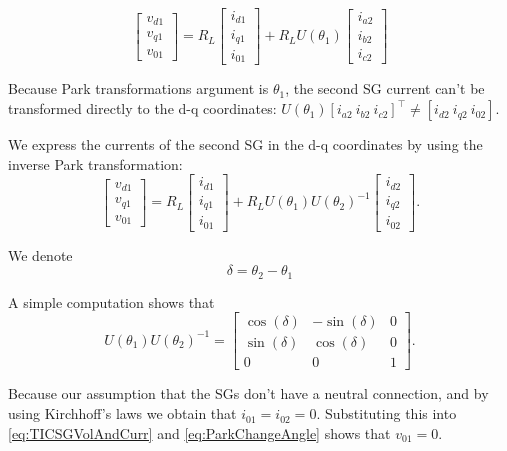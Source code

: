 \documentclass[conference]{IEEEtran}
\newcommand{\BE}{\begin{equation}}
\newcommand{\BEQ}[1]{\BE\label{#1}} %
\begin{document}
$$
\left[\begin{array}{c}
v_{d1}\\
v_{q1}\\
v_{01}
\end{array}\right]=R_{L}\left[\begin{array}{c}
i_{d1}\\
i_{q1}\\
i_{01}
\end{array}\right]+R_{L}U(\theta_{1})\left[\begin{array}{c}
i_{a2}\\
i_{b2}\\
i_{c2}
\end{array}\right]
$$

Because Park transformations argument is  $\theta_1$,  the second SG current can't be transformed directly to the d-q coordinates:   $U(\theta_{1})\left[ i_{a2}\ i_{b2}\ i_{c2}\right]^\top \neq \left[ i_{d2}\ i_{q2}\ i_{02}\right]$. 

We express  the currents of the second SG in the d-q coordinates by using the inverse Park transformation: 
\BEQ{eq:TICSGVolAndCurr}
 \left[\begin{array}{c}
v_{d1}\\
v_{q1}\\
v_{01}
\end{array}\right]=R_{L}\left[\begin{array}{c}
i_{d1}\\
i_{q1}\\
i_{01}
\end{array}\right]+R_{L}U(\theta_{1})U(\theta_{2})^{-1}\left[\begin{array}{c}
i_{d2}\\
i_{q2}\\
i_{02}
\end{array}\right].
\end{equation}

We denote $$\delta=\theta_{2}-\theta_{1}$$

A simple computation shows that 
\BEQ{eq:ParkChangeAngle}
  U(\theta_{1})U(\theta_{2})^{-1}=\left[\begin{array}{ccc}
\cos(\delta) & -\sin(\delta) & 0\\
\sin(\delta) & \cos(\delta) & 0\\
0 & 0 & 1
\end{array}\right].
\end{equation}

Because our assumption that the SGs don't have a neutral connection, and by using Kirchhoff's laws we obtain that $i_{01}=i_{02}=0$.  Substituting this into \eqref{eq:TICSGVolAndCurr} and \eqref{eq:ParkChangeAngle} shows that $v_{01} = 0$.
\end{document}
